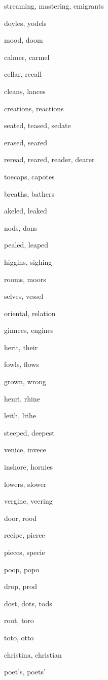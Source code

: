     \item streaming, mastering, emigrants
    \item doyles, yodels
    \item mood, doom
    \item calmer, carmel
    \item cellar, recall
    \item cleans, lances
    \item creations, reactions
    \item seated, teased, sedate
    \item erased, seared
    \item reread, reared, reader, dearer
    \item toecaps, capotes
    \item breaths, bathers
    \item akeled, leaked
    \item nods, dons
    \item pealed, leaped
    \item higgins, sighing
    \item rooms, moors
    \item selves, vessel
    \item oriental, relation
    \item ginnees, engines
    \item herit, their
    \item fowls, flows
    \item grown, wrong
    \item henri, rhine
    \item leith, lithe
    \item steeped, deepest
    \item venice, invece
    \item inshore, hornies
    \item lowers, slower
    \item vergine, veering
    \item door, rood
    \item recipe, pierce
    \item pieces, specie
    \item poop, popo
    \item drop, prod
    \item dost, dots, tods
    \item root, toro
    \item toto, otto
    \item christina, christian
    \item poet's, poets'
